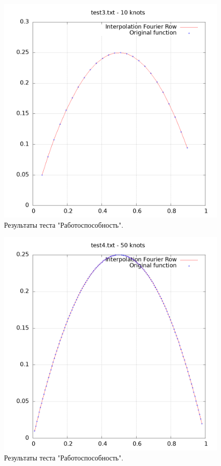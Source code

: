 \documentclass[14pt,a4paper]{extarticle}
\newcommand{\1}{\mathbbm{1}}
\begin{document}
    \begin{figure}
        \centering
        \includegraphics[scale=0.5]{Images/test3.txt.png}
        \caption{Результаты теста "Работоспособность".}
    \end{figure}
    \begin{figure}
        \centering
        \includegraphics[scale=0.5]{Images/test4.txt.png}
        \caption{Результаты теста "Работоспособность".}
    \end{figure}
\end{document}
